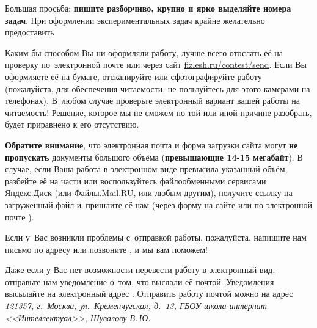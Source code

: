 Большая просьба: \textbf{пишите разборчиво, крупно и ярко выделяйте номера задач}.
При оформлении экспериментальных задач крайне желательно предоставить

Каким бы способом Вы ни оформляли работу, лучше всего отослать её на проверку по~электронной
почте \href{mailto:\olympmail}{\olympmail}
или через сайт \href{http://fizlesh.ru/contest/send}{fizlesh.ru/contest/send}.
Если Вы оформляете её на бумаге, отсканируйте или сфотографируйте работу
(пожалуйста, для обеспечения читаемости, не пользуйтесь для этого камерами на телефонах).
В~любом случае проверьте электронный вариант вашей работы на читаемость!
Решение, которое мы не сможем по той или иной причине разобрать, будет приравнено к его отсутствию.

\textbf{Обратите внимание}, что электронная почта и форма загрузки сайта могут \textbf{не пропускать}
документы большого объёма (\textbf{превышающие 14-15 мегабайт}). В случае, если Ваша работа в электронном
виде превысила указанный объём, разбейте её на части или воспользуйтесь файлообменными сервисами
\mbox{Яндекс.Диск} (или \mbox{Файлы.Mail.RU}, или любым другим), получите ссылку на загруженный файл
и~пришлите её нам (через форму на сайте или по электронной почте \href{mailto:\olympmail}{\olympmail}).

Если у~Вас возникли проблемы с~отправкой работы, пожалуйста, напишите нам письмо
по адресу \olympspocmail{} или позвоните \olympspocphone, и мы вам поможем!

Даже если у Вас нет возможности перевести работу в электронный вид, отправьте нам уведомление
о~том, что выслали её почтой. Уведомления высылайте
на электронный адрес \href{mailto:\olympmail}{\olympmail}.
Отправить работу почтой можно на адрес \emph{121357, г.~Москва, ул.~Кременчугская, д.~13,
ГБОУ школа-интернат <<Интеллектуал>>, Шувалову В.\,Ю.}
